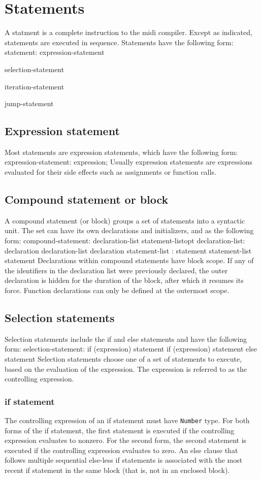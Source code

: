 \documentclass[12pt,A4]{book}
\begin{document}
\section{Statements}
A statment is a complete instruction to the midi compiler. Except as indicated, statements are executed in sequence.  Statements have the following form:
statement:        expression-statement

        selection-statement

        iteration-statement

        jump-statement
\subsection{Expression statement}
Most statements are expression statements, which have the following form:
expression-statement:        expression;
Usually expression statements are expressions evaluated for their side effects such as assignments or function calls.
\subsection{Compound statement or block}
A compound statement (or block) groups a set of statements into a syntactic unit.  The set can have its own declarations and initializers, and as the following form:
compound-statement:        {declaration-list statement-listopt}
declaration-list:        declaration
                    declaration-list declaration
statement-list    :        statement
                    statement-list statement
Declarations within compound statements have block scope.  If any of the identifiers in the declaration list were previously declared, the outer declaration is hidden for the duration of the block, after which it resumes its force.  Function declarations can only be defined at the outermost scope.
\subsection{Selection statements}
Selection statements include the if and else statements and have the following form:
selection-statement:        if (expression) statement
                    if (expression) statement else statement
Selection statements choose one of a set of statements to execute, based on the evaluation of the expression.  The expression is referred to as the controlling expression.
\subsubsection{if statement}
The controlling expression of an if  statement must have \verb|Number| type. For both forms of the if statement, the first statement is executed if the controlling expression evaluates to nonzero.  For the second form, the second statement is executed if the controlling expression evaluates to zero.  An else clause that follows multiple sequential else-less if statements is associated with the most recent if statement in the same block (that is, not in an enclosed block).
\end{document}

